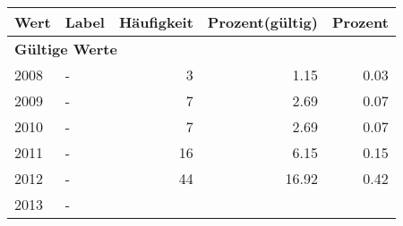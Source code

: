      \begin{longtable}{lXrrr}
     \toprule
     \textbf{Wert} & \textbf{Label} & \textbf{Häufigkeit} & \textbf{Prozent(gültig)} & \textbf{Prozent} \\
     \endhead
     \midrule
     \multicolumn{5}{l}{\textbf{Gültige Werte}}\\

     2008 &
     \multicolumn{1}{X}{ -  } &


       \num{3} &
       \num[round-mode=places,round-precision=2]{1.15} &
         \num[round-mode=places,round-precision=2]{0.03} \\

     2009 &
     \multicolumn{1}{X}{ -  } &


       \num{7} &
       \num[round-mode=places,round-precision=2]{2.69} &
         \num[round-mode=places,round-precision=2]{0.07} \\

     2010 &
     \multicolumn{1}{X}{ -  } &


       \num{7} &
       \num[round-mode=places,round-precision=2]{2.69} &
         \num[round-mode=places,round-precision=2]{0.07} \\

     2011 &
     \multicolumn{1}{X}{ -  } &


       \num{16} &
       \num[round-mode=places,round-precision=2]{6.15} &
         \num[round-mode=places,round-precision=2]{0.15} \\

     2012 &
     \multicolumn{1}{X}{ -  } &


       \num{44} &
       \num[round-mode=places,round-precision=2]{16.92} &
         \num[round-mode=places,round-precision=2]{0.42} \\

     2013 &
     \multicolumn{1}{X}{ -  } &



\end{longtable}
